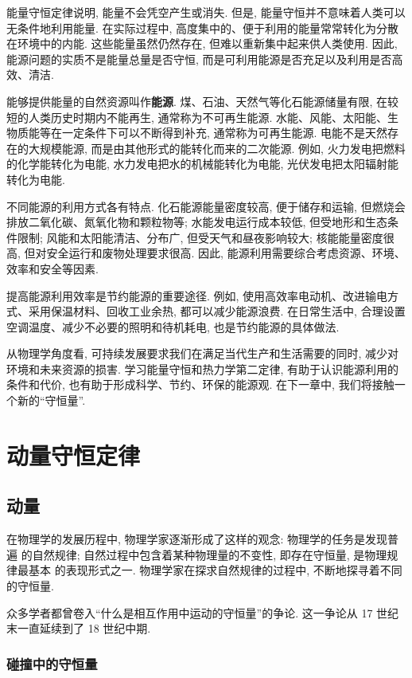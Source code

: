 \documentclass[11pt,a4paper]{ctexbook}
\begin{document}
能量守恒定律说明, 能量不会凭空产生或消失. 但是, 能量守恒并不意味着人类可以无条件地利用能量.
在实际过程中, 高度集中的、便于利用的能量常常转化为分散在环境中的内能. 这些能量虽然仍然存在,
但难以重新集中起来供人类使用. 因此, 能源问题的实质不是能量总量是否守恒, 而是可利用能源是否充足以及利用是否高效、清洁.

能够提供能量的自然资源叫作\textbf{能源}. 煤、石油、天然气等化石能源储量有限, 在较短的人类历史时期内不能再生,
通常称为不可再生能源. 水能、风能、太阳能、生物质能等在一定条件下可以不断得到补充, 通常称为可再生能源.
电能不是天然存在的大规模能源, 而是由其他形式的能转化而来的二次能源. 例如, 火力发电把燃料的化学能转化为电能,
水力发电把水的机械能转化为电能, 光伏发电把太阳辐射能转化为电能.

不同能源的利用方式各有特点. 化石能源能量密度较高, 便于储存和运输, 但燃烧会排放二氧化碳、氮氧化物和颗粒物等;
水能发电运行成本较低, 但受地形和生态条件限制; 风能和太阳能清洁、分布广, 但受天气和昼夜影响较大;
核能能量密度很高, 但对安全运行和废物处理要求很高. 因此, 能源利用需要综合考虑资源、环境、效率和安全等因素.

提高能源利用效率是节约能源的重要途径. 例如, 使用高效率电动机、改进输电方式、采用保温材料、回收工业余热,
都可以减少能源浪费. 在日常生活中, 合理设置空调温度、减少不必要的照明和待机耗电, 也是节约能源的具体做法.

从物理学角度看, 可持续发展要求我们在满足当代生产和生活需要的同时, 减少对环境和未来资源的损害.
学习能量守恒和热力学第二定律, 有助于认识能源利用的条件和代价, 也有助于形成科学、节约、环保的能源观.
在下一章中, 我们将接触一个新的``守恒量''.

\chapter{动量守恒定律}
\section{动量}
\label{第一节动量}

在物理学的发展历程中, 物理学家逐渐形成了这样的观念: 物理学的任务是发现普遍
的自然规律; 自然过程中包含着某种物理量的不变性, 即存在守恒量, 是物理规律最基本
的表现形式之一. 物理学家在探求自然规律的过程中, 不断地探寻着不同的守恒量.

众多学者都曾卷入``什么是相互作用中运动的守恒量''的争论. 这一争论从 17 世纪
末一直延续到了 18 世纪中期.

\subsection*{碰撞中的守恒量}
\end{document}
